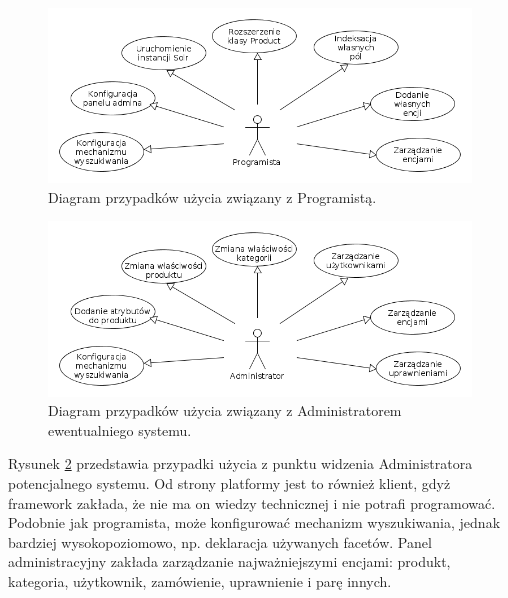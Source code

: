 \begin{figure}
\begin{center}
	\includegraphics[width=1\textwidth]{ucdev.png}
\end{center}
\caption{{\color{black}Diagram przypadków użycia związany z Programistą.}} \label{useCaseProgrammer}
\end{figure}
\begin{figure}
	\begin{center}
		\includegraphics[width=1\textwidth]{ucadmin.png}
	\end{center}
	\caption{{\color{black}Diagram przypadków użycia związany z Administratorem ewentualniego systemu.}} \label{useCaseAdmin}
\end{figure}
Rysunek \ref{useCaseAdmin} przedstawia przypadki użycia z punktu widzenia Administratora potencjalnego systemu. Od strony platformy jest to również klient, gdyż framework zakłada, że nie ma on wiedzy technicznej i nie potrafi programować. Podobnie jak programista, może konfigurować mechanizm wyszukiwania, jednak bardziej wysokopoziomowo, np. deklaracja używanych facetów. Panel administracyjny zakłada zarządzanie najważniejszymi encjami: produkt, kategoria, użytkownik, zamówienie, uprawnienie i parę innych.

